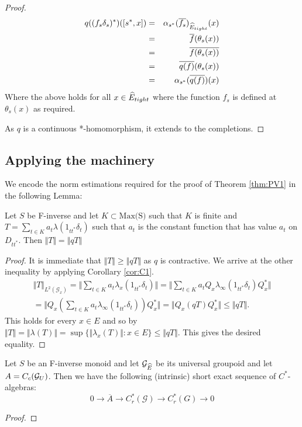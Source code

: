 \begin{corollary}
\begin{proof}
\begin{eqnarray*}
q((f_{s}\delta_{s})^{*})([s^{*},x])& = &\alpha_{s^{*}}(\overline{f_{s}})_{\widehat{E}_{tight}}(x)\\
& = & \overline{f}(\theta_{s}(x)) \\ & = & \overline{f(\theta_{s}(x))} \\ & = & \overline{q(f)}(\theta_{s}(x)) \\ & = &  \alpha_{s^{*}}(\overline{q(f)})(x)
\end{eqnarray*}
Where the above holds for all $x \in \widehat{E}_{tight}$ where the function $f_{s}$ is defined at $\theta_{s}(x)$ as required.

As $q$ is a continuous *-homomorphism, it extends to the completions.
\end{proof}

\subsection{Applying the machinery}\label{sect:S1-a}
We encode the norm estimations required for the proof of Theorem \ref{thm:PV1} in the following Lemma:
\begin{lemma}\label{lem:L3}
Let $S$ be F-inverse and let $K \subset \text{Max(S)}$ such that $K$ is finite and $T=\sum_{t \in K} a_{t}\lambda(1_{tt^{*}}\delta_{t})$ such that $a_{t}$ is the constant function that has value $a_{t}$ on $D_{tt^{*}}$. Then $\Vert T \Vert = \Vert qT \Vert$
\end{lemma}
\begin{proof}
It is immediate that $\Vert T \Vert \geq \Vert qT \Vert$ as $q$ is contractive. We arrive at the other inequality by applying Corollary \ref{cor:C1}.
\begin{eqnarray*}
\Vert T \Vert_{L^{2}(\mathcal{G}_{x})} = \Vert \sum_{t \in K} a_{t}\lambda_{x}(1_{tt^{*}}\delta_{t}) \Vert = \Vert \sum_{t \in K} a_{t}Q_{x}\lambda_{\infty}(1_{tt^{*}}\delta_{t})Q_{x}^{*} \Vert \\
= \Vert Q_{x}(\sum_{t \in K} a_{t}\lambda_{\infty}(1_{tt^{*}}\delta_{t}))Q_{x}^{*} \Vert = \Vert Q_{x}(qT)Q_{x}^{*} \Vert \leq \Vert qT \Vert.
\end{eqnarray*}
This holds for every $x \in E$ and so by  $\Vert T \Vert = \Vert \lambda(T) \Vert = \sup \lbrace \Vert \lambda_{x}(T) \Vert : x \in E \rbrace \leq \Vert qT \Vert$. This gives the desired equality.  
\end{proof}

\begin{theorem}\label{thm:PV1}
Let $S$ be an F-inverse monoid and let $\mathcal{G}_{\widehat{E}}$ be its universal groupoid and let $A=C_{c}(\mathcal{G}_{U})$. Then we have the following (intrinsic) short exact sequence of $C^{*}$-algebras:
\begin{equation*}
0 \rightarrow \overline{A} \rightarrow C^{*}_{r}(\mathcal{G}) \rightarrow C^{*}_{r}(G) \rightarrow 0
\end{equation*}
\end{theorem}
\begin{proof}


\end{proof}
\end{corollary}
